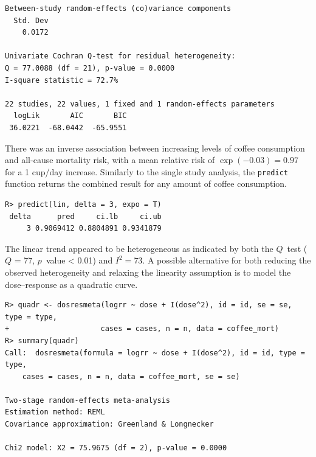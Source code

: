 \documentclass[11pt,a4paper,twoside,openany]{book}\usepackage{knitr}
\begin{document}
{\begin{knitrout}
\begin{kframe}
\begin{verbatim}
Between-study random-effects (co)variance components
  Std. Dev
    0.0172

Univariate Cochran Q-test for residual heterogeneity:
Q = 77.0088 (df = 21), p-value = 0.0000
I-square statistic = 72.7%

22 studies, 22 values, 1 fixed and 1 random-effects parameters
  logLik       AIC       BIC  
 36.0221  -68.0442  -65.9551  
\end{verbatim}
\end{kframe}
\end{knitrout}

\noindent There was an inverse association between increasing levels of coffee consumption and all-cause mortality risk, with a mean relative risk of $\exp(-0.03) = 0.97$ for a 1 cup/day increase. Similarly to the single study analysis, the \texttt{predict} function returns the combined result for any amount of coffee consumption.
\begin{knitrout}\footnotesize
{}\color{fgcolor}\begin{kframe}
\begin{verbatim}
R> predict(lin, delta = 3, expo = T)
 delta      pred     ci.lb     ci.ub
     3 0.9069412 0.8804891 0.9341879
\end{verbatim}
\end{kframe}
\end{knitrout}

\noindent The linear trend appeared to be heterogeneous as indicated by both the $Q$~test ($Q$ = 77, $p$~value < 0.01) and $I^2 = 73$.
A possible alternative for both reducing the observed heterogeneity and relaxing the linearity assumption is to model the dose--response as a quadratic curve.
\begin{knitrout}\footnotesize
{}\color{fgcolor}\begin{kframe}
\begin{verbatim}
R> quadr <- dosresmeta(logrr ~ dose + I(dose^2), id = id, se = se, type = type,
+                     cases = cases, n = n, data = coffee_mort)
R> summary(quadr)
Call:  dosresmeta(formula = logrr ~ dose + I(dose^2), id = id, type = type, 
    cases = cases, n = n, data = coffee_mort, se = se)

Two-stage random-effects meta-analysis
Estimation method: REML
Covariance approximation: Greenland & Longnecker

Chi2 model: X2 = 75.9675 (df = 2), p-value = 0.0000


\end{verbatim}
\end{kframe}
\end{knitrout}}
\end{document}
